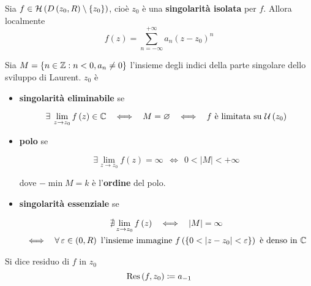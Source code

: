 \Soluzione
\begin{thm}
Sia $f\in \mathcal{H} \left(D\left(z_{0} ,R\right) \setminus \left\{z_{0}\right\}\right)$, cioè $z_{0}$ è una \textbf{singolarità isolata} per $f$. Allora localmente
\begin{equation*}
f\left(z\right) = \sum\limits ^{ + \infty }_{n = -\infty } a_{n}\left(z - z_{0}\right)^{n}
\end{equation*}
\end{thm}
\begin{thm}
Sia $M = \left\{n\in \mathbb{Z}  :n < 0,a_{n} \neq 0\right\}$ l'insieme degli indici della parte singolare dello sviluppo di Laurent. $z_{0}$ è

\begin{itemize}
\item \textbf{singolarità eliminabile} se

\begin{equation*}
\exists \lim\limits _{z\rightarrow z_{0}} f\left(z\right) \in \CC  \ \ \iff \ \ M = \emptyset \ \ \iff \ \ f\ \text{è limitata su} \ \Uc \left(z_{0}\right)
\end{equation*}
\item \textbf{polo} se

\begin{equation*}
\exists \lim\limits _{z\rightarrow z_{0}} f\left(z\right) = \infty \ \ \iff \ \ 0 < \left| M\right| < + \infty 
\end{equation*}

dove $ - \min M = k$ è l'\textbf{ordine} del polo.
\item \textbf{singolarità essenziale} se

\begin{gather*}
\nexists \lim\limits _{z\rightarrow z_{0}} f\left(z\right) \ \ \iff \ \ \left| M\right| = \infty \\
\iff \ \ \forall \varepsilon \in \left(0,R\right) \ \text{l'insieme immagine} \ f\left(\left\{0 < \left| z - z_{0}\right| < \varepsilon \right\}\right) \ \text{è denso in} \ \CC 
\end{gather*}
\end{itemize}
\end{thm}
\begin{defn}
Si dice residuo di $f$ in $z_{0}$
\begin{equation*}
\operatorname{Res} \left(f,z_{0}\right) \coloneqq a_{ - 1}
\end{equation*}
\end{defn}
